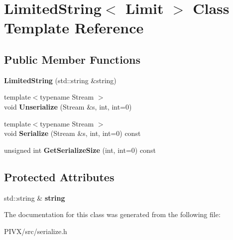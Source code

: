 \hypertarget{class_limited_string}{}\section{Limited\+String$<$ Limit $>$ Class Template Reference}
\label{class_limited_string}
\subsection*{Public Member Functions}
\begin{DoxyCompactItemize}
\item 
\mbox{\label{class_limited_string_afd9b0daa877f4d28c6b909bd34fd597d}} 
{\bfseries Limited\+String} (std\+::string \&string)
\item 
\mbox{\label{class_limited_string_a21ec9b742da8f8ff7b9a8b89131f943b}} 
{\footnotesize template$<$typename Stream $>$ }\\void {\bfseries Unserialize} (Stream \&s, int, int=0)
\item 
\mbox{\label{class_limited_string_acb90369fef0efc1d51b730baa23307d8}} 
{\footnotesize template$<$typename Stream $>$ }\\void {\bfseries Serialize} (Stream \&s, int, int=0) const
\item 
\mbox{\label{class_limited_string_a9b5f6a92ed889442a212444ed51fcea9}} 
unsigned int {\bfseries Get\+Serialize\+Size} (int, int=0) const
\end{DoxyCompactItemize}
\subsection*{Protected Attributes}
\begin{DoxyCompactItemize}
\item 
\mbox{\label{class_limited_string_a3f1d004f4632f7b2fda1a5a5afc266f7}} 
std\+::string \& {\bfseries string}
\end{DoxyCompactItemize}


The documentation for this class was generated from the following file\+:\begin{DoxyCompactItemize}
\item 
P\+I\+V\+X/src/serialize.\+h\end{DoxyCompactItemize}
